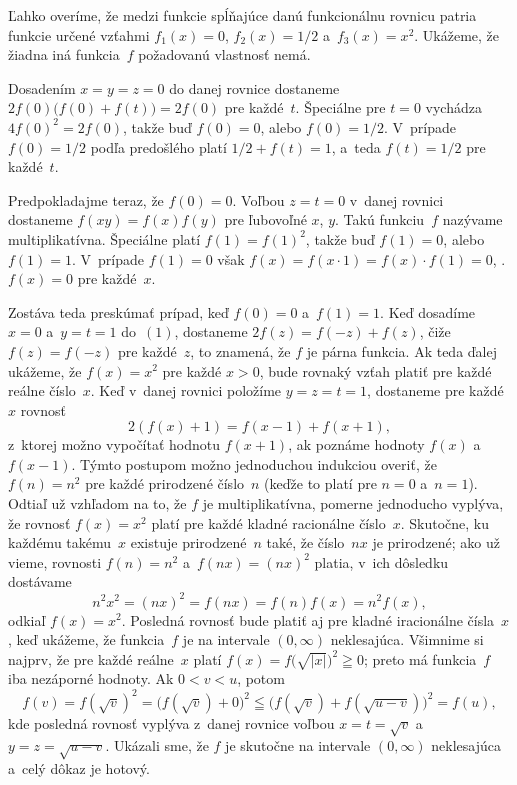 {%
Ľahko overíme, že medzi funkcie spĺňajúce danú funkcionálnu
rovnicu patria funkcie určené vzťahmi $f_1(x)=0$, $f_2(x)=1/2$
a~$f_3(x)=x^2$. Ukážeme, že žiadna iná funkcia~$f$ požadovanú
vlastnosť nemá.

Dosadením $x=y=z=0$ do danej rovnice dostaneme
$2f(0)\bigl(f(0)+f(t)\bigr)=2f(0)$ pre každé~$t$. Špeciálne pre
$t=0$ vychádza $4f(0)^2=2f(0)$, takže buď $f(0)=0$, alebo
$f(0)=1/2$. V~prípade $f(0)=1/2$ podľa predošlého platí
$1/2+f(t)=1$, a~teda $f(t)=1/2$ pre každé~$t$.

Predpokladajme teraz, že $f(0)=0$. Voľbou $z=t=0$ v~danej rovnici
dostaneme $f(xy)=f(x)f(y)$ pre ľubovoľné $x$, $y$. Takú funkciu~$f$
nazývame multiplikatívna. Špeciálne platí $f(1)=f(1)^2$,
takže buď $f(1)=0$, alebo $f(1)=1$. V~prípade $f(1)=0$ však
$f(x)=f(x\cdot1)=f(x)\cdot f(1)=0$, \tj. $f(x)=0$ pre každé~$x$.

Zostáva teda preskúmať prípad, keď $f(0)=0$ a~$f(1)=1$.
Keď dosadíme $x=0$ a~$y=t=1$ do~$(1)$, dostaneme
$2f(z)=f({-z})+f(z)$, čiže $f(z)=f({-z})$ pre každé~$z$, to
znamená, že $f$ je párna funkcia. Ak teda ďalej ukážeme, že
$f(x)=x^2$ pre každé $x>0$, bude rovnaký vzťah platiť pre každé
reálne číslo~$x$. Keď v~danej rovnici položíme $y=z=t=1$, dostaneme
pre každé~$x$ rovnosť
$$
2(f(x)+1)=f(x-1)+f(x+1),
$$
z~ktorej možno vypočítať hodnotu $f(x+1)$, ak poznáme hodnoty $f(x)$
a~$f({x-1})$. Týmto postupom možno jednoduchou indukciou overiť, že
$f(n)=n^2$ pre každé prirodzené číslo~$n$ (keďže to platí pre
$n=0$ a~$n=1$). Odtiaľ už vzhľadom na to, že $f$ je
multiplikatívna, pomerne jednoducho vyplýva, že rovnosť $f(x)=x^2$
platí pre každé kladné racionálne číslo~$x$. Skutočne, ku
každému takému~$x$ existuje prirodzené~$n$ také, že číslo~$nx$
je prirodzené; ako už vieme, rovnosti $f(n)=n^2$ a~$f(nx)=(nx)^2$
platia, v~ich dôsledku dostávame
$$
n^2x^2=(nx)^2=f(nx)=f(n)f(x)=n^2f(x),
$$
odkiaľ $f(x)=x^2$. Posledná rovnosť bude platiť aj pre kladné iracionálne
čísla~$x$, keď ukážeme, že funkcia~$f$ je na
intervale $(0,\infty)$ neklesajúca. Všimnime si najprv, že pre
každé reálne~$x$ platí $f(x)=f\bigl(\sqrt{|x|}\bigr)^2\geqq0$; preto má
funkcia~$f$ iba nezáporné hodnoty. Ak $0<v<u$, potom
$$
f(v)=f(\sqrt{v})^2=\bigl(f(\sqrt{v})+0\bigr)^2
\leqq\bigl(f(\sqrt{v})+f(\sqrt{u-v})\bigr)^2=f(u),
$$
kde posledná rovnosť vyplýva z~danej rovnice voľbou $x=t=\sqrt{v}$
a~$y=z=\sqrt{u-v}$. Ukázali sme, že $f$ je skutočne na intervale
$(0,\infty)$ neklesajúca a~celý dôkaz je hotový.}

